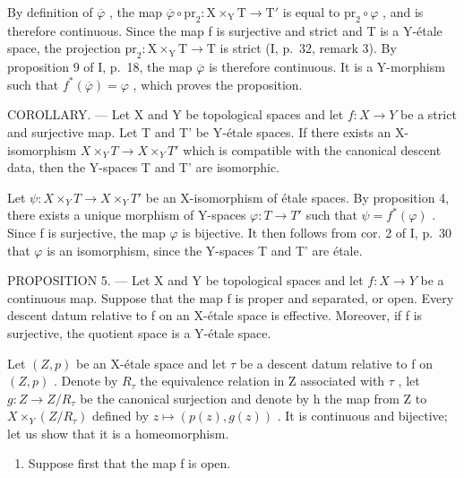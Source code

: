 By definition of \(\overline{\varphi}\) , the map \(\overline{\varphi} \circ \mathrm{pr}_2: \mathrm{X} \times_{\mathrm{Y}} \mathrm{T} \to \mathrm{T}'\) is equal to \(\mathrm{pr}_2 \circ \varphi\) , and is therefore continuous. Since the map f is surjective and strict and T is a Y-étale space, the projection \(\mathrm{pr}_2: \mathrm{X} \times_{\mathrm{Y}} \mathrm{T} \to \mathrm{T}\) is strict (I, p.~32, remark 3). By proposition 9 of I, p.~18, the map \(\overline{\varphi}\) is therefore continuous. It is a Y-morphism such that \(f^*(\overline{\varphi}) = \varphi\) , which proves the proposition.

COROLLARY. --- Let X and Y be topological spaces and let \(f: X \rightarrow Y\) be a strict and surjective map. Let T and T' be Y-étale spaces. If there exists an X-isomorphism \(X \times_{Y} T \rightarrow X \times_{Y} T'\) which is compatible with the canonical descent data, then the Y-spaces T and T' are isomorphic.

Let \(\psi\colon X\times_{Y}T\to X\times_{Y}T'\) be an X-isomorphism of étale spaces. By proposition 4, there exists a unique morphism of Y-spaces \(\varphi\colon T \to T'\) such that \(\psi = f^{*}(\varphi)\) . Since f is surjective, the map \(\varphi\) is bijective. It then follows from cor. 2 of I, p.~30 that \(\varphi\) is an isomorphism, since the Y-spaces T and T' are étale.

PROPOSITION 5. --- Let X and Y be topological spaces and let \(f: X \to Y\) be a continuous map. Suppose that the map f is proper and separated, or open. Every descent datum relative to f on an X-étale space is effective. Moreover, if f is surjective, the quotient space is a Y-étale space.

Let \((Z,p)\) be an X-étale space and let \(\tau\) be a descent datum relative to f on \((Z,p)\) . Denote by \(R_{\tau}\) the equivalence relation in Z associated with \(\tau\) , let \(g: Z \to Z/R_{\tau}\) be the canonical surjection and denote by h the map from Z to \(X \times_{Y} (Z/R_{\tau})\) defined by \(z \mapsto (p(z), g(z))\) . It is continuous and bijective; let us show that it is a homeomorphism.

\begin{enumerate}
\def\labelenumi{\alph{enumi})}
\tightlist
\item
  Suppose first that the map f is open.
\end{enumerate}

